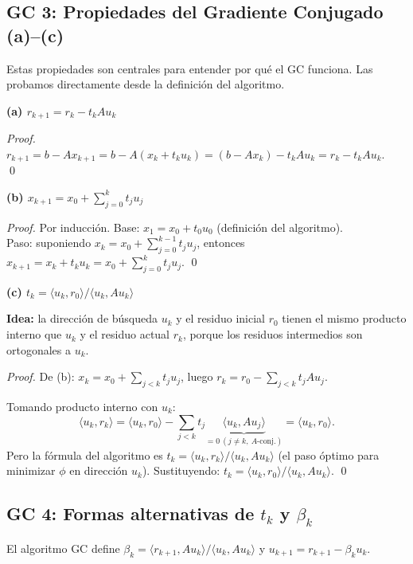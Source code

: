 \documentclass[11pt,a4paper]{article}
\begin{document}
\subsection{GC 3: Propiedades del Gradiente Conjugado (a)--(c)}

Estas propiedades son centrales para entender por qué el GC funciona. Las probamos directamente desde la definición del algoritmo.

\textbf{(a) $r_{k+1} = r_k - t_k Au_k$}

\begin{proof}
$r_{k+1}=b-Ax_{k+1}=b-A(x_k+t_ku_k)=(b-Ax_k)-t_kAu_k=r_k-t_kAu_k$. \qed
\end{proof}

\textbf{(b) $x_{k+1} = x_0 + \sum_{j=0}^k t_j u_j$}

\begin{proof}
Por inducción. Base: $x_1=x_0+t_0u_0$ (definición del algoritmo). \\
Paso: suponiendo $x_k=x_0+\sum_{j=0}^{k-1}t_ju_j$, entonces $x_{k+1}=x_k+t_ku_k=x_0+\sum_{j=0}^kt_ju_j$. \qed
\end{proof}

\textbf{(c) $t_k = \langle u_k,r_0\rangle/\langle u_k,Au_k\rangle$}

\textbf{Idea:} la dirección de búsqueda $u_k$ y el residuo inicial $r_0$ tienen el mismo producto interno que $u_k$ y el residuo actual $r_k$, porque los residuos intermedios son ortogonales a $u_k$.

\begin{proof}
De (b): $x_k=x_0+\sum_{j<k}t_ju_j$, luego $r_k=r_0-\sum_{j<k}t_jAu_j$.

Tomando producto interno con $u_k$:
\[
  \langle u_k,r_k\rangle
  = \langle u_k,r_0\rangle - \sum_{j<k}t_j\underbrace{\langle u_k,Au_j\rangle}_{=0\ (j\ne k,\ A\text{-conj.})}
  = \langle u_k,r_0\rangle.
\]
Pero la fórmula del algoritmo es $t_k=\langle u_k,r_k\rangle/\langle u_k,Au_k\rangle$
(el paso óptimo para minimizar $\phi$ en dirección $u_k$).
Sustituyendo: $t_k=\langle u_k,r_0\rangle/\langle u_k,Au_k\rangle$. \qed
\end{proof}

\subsection{GC 4: Formas alternativas de $t_k$ y $\beta_k$}
\label{sec:gc_altformas}

El algoritmo GC define $\beta_k = \langle r_{k+1},Au_k\rangle/\langle u_k,Au_k\rangle$
y $u_{k+1} = r_{k+1} - \beta_k u_k$.
\end{document}
